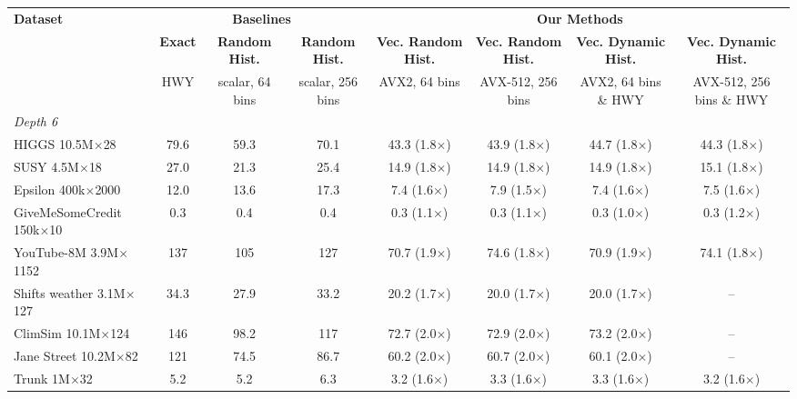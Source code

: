 \begin{table}[p]
    \centering
    \footnotesize
    \setlength{\tabcolsep}{2.5pt}
    \begin{tabular}{l|ccc|cccc}
        \hline
        \multirow{3}{*}{\textbf{Dataset}} & \multicolumn{3}{c|}{\textbf{Baselines}} & \multicolumn{4}{c}{\textbf{Our Methods}} \\
         & \textbf{Exact} & \textbf{Random Hist.} & \textbf{Random Hist.} & \textbf{Vec. Random Hist.} & \textbf{Vec. Random Hist.} & \textbf{Vec. Dynamic Hist.} & \textbf{Vec. Dynamic Hist.} \\
         & \scriptsize HWY & \scriptsize scalar, 64 bins & \scriptsize scalar, 256 bins & \scriptsize AVX2, 64 bins & \scriptsize AVX-512, 256 bins & \scriptsize AVX2, 64 bins \& HWY & \scriptsize AVX-512, 256 bins \& HWY \\
        \hline
        \multicolumn{8}{l}{\textit{Depth 6}} \\
        HIGGS 10.5M$\times$28 & 79.6 & 59.3 & 70.1 & 43.3 (1.8$\times$) & 43.9 (1.8$\times$) & 44.7 (1.8$\times$) & 44.3 (1.8$\times$) \\
        SUSY 4.5M$\times$18 & 27.0 & 21.3 & 25.4 & 14.9 (1.8$\times$) & 14.9 (1.8$\times$) & 14.9 (1.8$\times$) & 15.1 (1.8$\times$) \\
        Epsilon 400k$\times$2000 & 12.0 & 13.6 & 17.3 & 7.4 (1.6$\times$) & 7.9 (1.5$\times$) & 7.4 (1.6$\times$) & 7.5 (1.6$\times$) \\
        GiveMeSomeCredit 150k$\times$10 & 0.3 & 0.4 & 0.4 & 0.3 (1.1$\times$) & 0.3 (1.1$\times$) & 0.3 (1.0$\times$) & 0.3 (1.2$\times$) \\
        YouTube-8M 3.9M$\times$1152 & 137 & 105 & 127 & 70.7 (1.9$\times$) & 74.6 (1.8$\times$) & 70.9 (1.9$\times$) & 74.1 (1.8$\times$) \\
        Shifts weather 3.1M$\times$127 & 34.3 & 27.9 & 33.2 & 20.2 (1.7$\times$) & 20.0 (1.7$\times$) & 20.0 (1.7$\times$) & -- \\
        ClimSim 10.1M$\times$124 & 146 & 98.2 & 117 & 72.7 (2.0$\times$) & 72.9 (2.0$\times$) & 73.2 (2.0$\times$) & -- \\
        Jane Street 10.2M$\times$82 & 121 & 74.5 & 86.7 & 60.2 (2.0$\times$) & 60.7 (2.0$\times$) & 60.1 (2.0$\times$) & -- \\
        Trunk 1M$\times$32 & 5.2 & 5.2 & 6.3 & 3.2 (1.6$\times$) & 3.3 (1.6$\times$) & 3.3 (1.6$\times$) & 3.2 (1.6$\times$) \\

\end{tabular}
\end{table}
